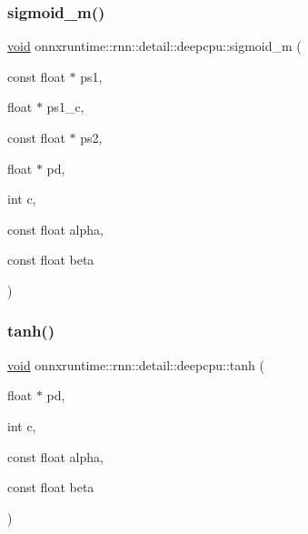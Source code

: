 \subsubsection{\texorpdfstring{sigmoid\+\_\+m()}{sigmoid\_m()}}
{\footnotesize\ttfamily \mbox{\hyperlink{mlasi_8h_a88f941d423cb2a819b70a1358982b1a6}{void}} onnxruntime\+::rnn\+::detail\+::deepcpu\+::sigmoid\+\_\+m (\begin{DoxyParamCaption}\item[{const float $\ast$}]{ps1,  }\item[{float $\ast$}]{ps1\+\_\+c,  }\item[{const float $\ast$}]{ps2,  }\item[{float $\ast$}]{pd,  }\item[{int}]{c,  }\item[{const float}]{alpha,  }\item[{const float}]{beta }\end{DoxyParamCaption})}

\mbox{\label{namespaceonnxruntime_1_1rnn_1_1detail_1_1deepcpu_aa90e134184fd5d4cc0b541e82ab265fc}} 
\subsubsection{\texorpdfstring{tanh()}{tanh()}}
{\footnotesize\ttfamily \mbox{\hyperlink{mlasi_8h_a88f941d423cb2a819b70a1358982b1a6}{void}} onnxruntime\+::rnn\+::detail\+::deepcpu\+::tanh (\begin{DoxyParamCaption}\item[{float $\ast$}]{pd,  }\item[{int}]{c,  }\item[{const float}]{alpha,  }\item[{const float}]{beta }\end{DoxyParamCaption})}

\mbox{\label{namespaceonnxruntime_1_1rnn_1_1detail_1_1deepcpu_ad249f79929fe978ce97ef9d64b36367b}} 
